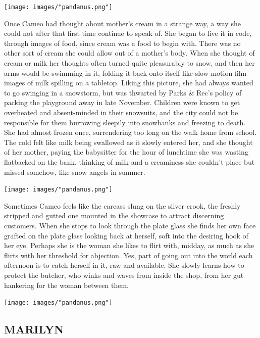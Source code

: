 \documentclass[
]{memoir}
\begin{document}
\begin{center}\texttt{[image: images/"pandanus.png"]}\end{center}

Once Cameo had thought about mother's cream in a strange way, a way she
could not after that first time continue to speak of. She began to live
it in code, through images of food, since cream was a food to begin
with. There was no other sort of cream she could allow out of a mother's
body. When she thought of cream or milk her thoughts often turned quite
pleasurably to snow, and then her arms would be swimming in it, folding
it back onto itself like slow motion film images of milk spilling on a
tabletop. Liking this picture, she had always wanted to go swinging in a
snowstorm, but was thwarted by Parks \& Rec's policy of packing the
playground away in late November. Children were known to get overheated
and absent-minded in their snowsuits, and the city could not be
responsible for them burrowing sleepily into snowbanks and freezing to
death. She had almost frozen once, surrendering too long on the walk
home from school. The cold felt like milk being swallowed as it slowly
entered her, and she thought of her mother, paying the babysitter for
the hour of lunchtime she was wasting flatbacked on the bank, thinking
of milk and a creaminess she couldn't place but missed somehow, like
snow angels in summer.

\begin{center}\texttt{[image: images/"pandanus.png"]}\end{center}

Sometimes Cameo feels like the carcass slung on the silver crook, the
freshly stripped and gutted one mounted in the showcase to attract
discerning customers. When she stops to look through the plate glass she
finds her own face grafted on the plate glass looking back at herself,
soft into the desiring hook of her eye. Perhaps she is the woman she
likes to flirt with, midday, as much as she flirts with her threshold
for abjection. Yes, part of going out into the world each afternoon is
to catch herself in it, raw and available. She slowly learns how to
protect the butcher, who winks and waves from inside the shop, from her
gut hankering for the woman between them.

\begin{center}\texttt{[image: images/"pandanus.png"]}\end{center}

\hypertarget{marilyn}{%
\subsection*{MARILYN}\label{marilyn}}
\end{document}
